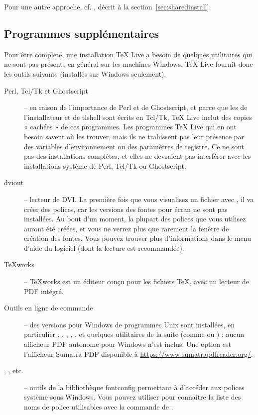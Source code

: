 \documentclass[german, english, french]{article}
\renewcommand{\TL}{\TeX{} Live\xspace}%
\begin{document}
Pour une autre approche, cf. , décrit à la
section~\ref{sec:sharedinstall}.

\subsection{Programmes supplémentaires}

Pour être complète, une installation \TL a besoin de quelques utilitaires qui ne
sont pas présents en général sur les machines Windows. \TL fournit donc les
outils suivants (installés sur Windows seulement).
\begin{description}
\item[Perl, Tcl/Tk et Ghostscript] -- en raison de l'importance de Perl et de
  Ghostscript, et parce que les \GUI{} de l'installateur et de tlshell sont
  écrits en Tcl/Tk, \TL{} inclut des copies « cachées » de ces programmes. Les
  programmes \TL{} qui en ont besoin savent où les trouver, mais ils ne
  trahissent pas leur présence par des variables d'environnement ou des
  paramètres de registre. Ce ne sont pas des installations complètes, et elles
  ne devraient pas interférer avec les installations système de Perl, Tcl/Tk ou
  Ghostscript.

\item[dviout] -- lecteur de DVI. La première fois que vous visualisez un fichier
  avec , il va créer des polices, car les versions des fontes pour
  écran ne sont pas installées. Au bout d'un moment, la plupart des polices que
  vous utilisez auront été créées, et vous ne verrez plus que rarement la
  fenêtre de création des fontes. Vous pouvez trouver plus d'informations dans
  le menu d'aide du logiciel (dont la lecture est recommandée).

\item[\TeX{}works] -- \TeX{}works est un éditeur conçu pour les fichiers \TeX,
  avec un lecteur de PDF intégré.

\item[Outils en ligne de commande] -- des versions pour Windows de programmes
  Unix sont installées, en particulier , ,
  , , ,  et
  quelques utilitaires de la suite  (comme  ou
  ) ; aucun afficheur PDF autonome pour Windows n'est
  inclus. Une option est l'afficheur Sumatra PDF disponible
  à \url{https://www.sumatrapdfreader.org/}.
\item[, , etc.] -- outils de la bibliothèque
  fontconfig permettant à \XeTeX{} d'accéder aux polices système sous
  Windows. Vous pouvez utiliser  pour connaître la liste des noms
  de police utilisables avec la commande  de \XeTeX.
\end{description}
\end{document}

